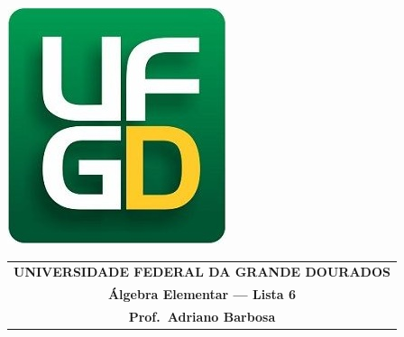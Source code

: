 \documentclass[a4paper,5pt]{amsbook}
\begin{document}
\thispagestyle{empty}
\pagestyle{empty}
\begin{minipage}[h]{0.14\textwidth}
	\includegraphics[scale=0.24]{../ufgd.png}
\end{minipage}
\begin{minipage}[h]{\textwidth}
\begin{tabular}{c}
{{\bf UNIVERSIDADE FEDERAL DA GRANDE DOURADOS}}\\
{{\bf \'Algebra Elementar --- Lista 6}}\\
{{\bf Prof.\ Adriano Barbosa}}\\
\end{tabular}
\vspace{-0.45cm}
%
\end{minipage}

\end{document}
